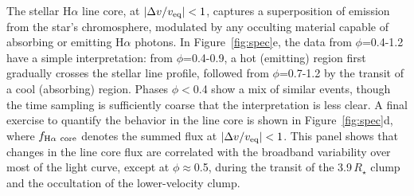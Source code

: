 \documentclass{nature3}
\begin{document}
The stellar H$\alpha$ line core, at $|\Delta v / v_{\rm
eq}|<1$, captures a superposition of emission from the star's
chromosphere, modulated by any occulting material capable of absorbing
or emitting H$\alpha$ photons.  In Figure~\ref{fig:spec}e, the data
from $\phi$=0.4-1.2 have a simple interpretation: from $\phi$=0.4-0.9,
a hot (emitting) region first gradually crosses the stellar line
profile, followed from $\phi$=0.7-1.2 by the transit of a cool
(absorbing) region. Phases $\phi$$<$0.4 show a mix of similar events,
though the time sampling is sufficiently coarse that the
interpretation is less clear.  A final exercise to quantify the
behavior in the line core is shown in Figure~\ref{fig:spec}d, where
$f_{\rm H\alpha\ core}$ denotes the summed flux at $|\Delta v / v_{\rm
eq}|<1$.  This panel shows that changes in the line core flux are
correlated with the broadband variability over most of the light
curve, except at $\phi$$\approx$0.5, during the transit of the
3.9\,$R_\star$ clump and the occultation of the lower-velocity clump.
\end{document}
